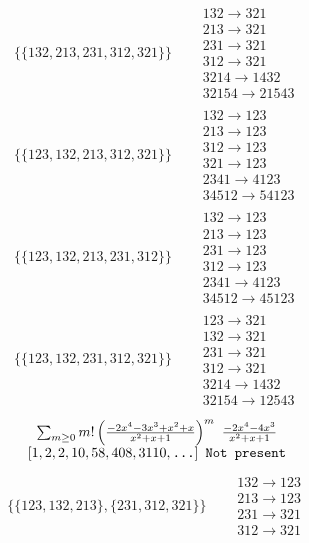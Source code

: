 \begin{tiny}
\begin{align}
\{\{132, 213, 231, 312, 321\}\}
\quad
&
\begin{matrix}
132 \to 321\\213 \to 321\\231 \to 321\\312 \to 321\\3214 \to 1432\\32154 \to 21543
\end{matrix}
\\
\{\{123, 132, 213, 312, 321\}\}
\quad
&
\begin{matrix}
132 \to 123\\213 \to 123\\312 \to 123\\321 \to 123\\2341 \to 4123\\34512 \to 54123
\end{matrix}
\\
\{\{123, 132, 213, 231, 312\}\}
\quad
&
\begin{matrix}
132 \to 123\\213 \to 123\\231 \to 123\\312 \to 123\\2341 \to 4123\\34512 \to 45123
\end{matrix}
\\
\{\{123, 132, 231, 312, 321\}\}
\quad
&
\begin{matrix}
123 \to 321\\132 \to 321\\231 \to 321\\312 \to 321\\3214 \to 1432\\32154 \to 12543
\end{matrix}
\end{align}
$$
\begin{matrix}
\sum_{m \geq 0} m! \left(
\frac{-2 x^{4} - 3 x^{3} + x^{2} + x}{x^{2} + x + 1}
\right)^m
\ 
\frac{-2 x^{4} - 4 x^{3}}{x^{2} + x + 1}
\\
\left[1, 2, 2, 10, 58, 408, 3110, \text{\texttt{...}}\right]
\ 
\texttt{Not present}
\end{matrix}
$$
\vspace{-1em}
\begin{align}
\{\{123, 132, 213\}, \{231, 312, 321\}\}
\quad
&
\begin{matrix}
132 \to 123\\213 \to 123\\231 \to 321\\312 \to 321
\end{matrix}
\end{align}
\end{tiny}
